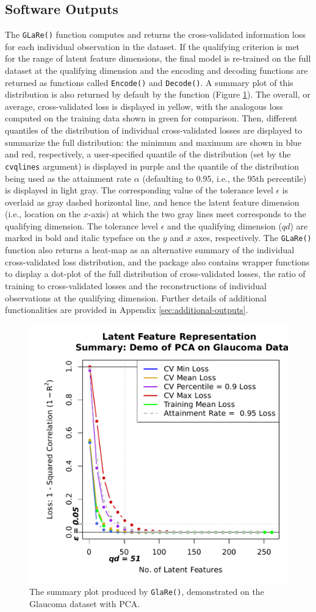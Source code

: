 \subsection{Software Outputs}

The \texttt{GLaRe()} function computes and returns the cross-validated information loss for each individual observation in the dataset.
If the qualifying criterion is met for the range of latent feature dimensions, the final model is re-trained on the full dataset at the qualifying dimension and the encoding and decoding functions are returned as  functions called \texttt{Encode()} and \texttt{Decode()}.
A summary plot of this distribution is also returned by default by the  function (Figure \ref{fig:glare-anatomy-plot}).
The overall, or average, cross-validated loss is displayed in yellow, with the analogous loss computed on the training data shown in green for comparison.
Then, different quantiles of the distribution of individual cross-validated losses are displayed to summarize the full distribution: the minimum and maximum are shown in blue and red, respectively, a user-specified quantile of the distribution (set by the \texttt{cvqlines} argument) is displayed in purple and the quantile of the distribution being used as the attainment rate $\alpha$ (defaulting to 0.95, i.e., the $95$th percentile) is displayed in light gray.
The corresponding value of the tolerance level $\epsilon$ is overlaid as gray dashed horizontal line, and hence the latent feature dimension (i.e., location on the $x$-axis) at which the two gray lines meet corresponds to the qualifying dimension.
The tolerance level $\epsilon$ and the qualifying dimension ($qd$) are marked in bold and italic typeface on the $y$ and $x$ axes, respectively.
The \texttt{GLaRe()} function also returns a heat-map as an alternative summary of the individual cross-validated loss distribution, and the package also contains wrapper functions to display a dot-plot of the full distribution of cross-validated losses, the ratio of training to cross-validated losses and the reconstructions of individual observations at the qualifying dimension. 
Further details of additional functionalities are provided in Appendix \ref{sec:additional-outputs}.

\begin{figure}
    \centering
    \includegraphics[width=0.5\linewidth]{figures/glare-anatomy-plot.pdf}
    \caption{The summary plot produced by \texttt{GlaRe()}, demonstrated on the Glaucoma dataset with PCA.}
    \label{fig:glare-anatomy-plot}
\end{figure}